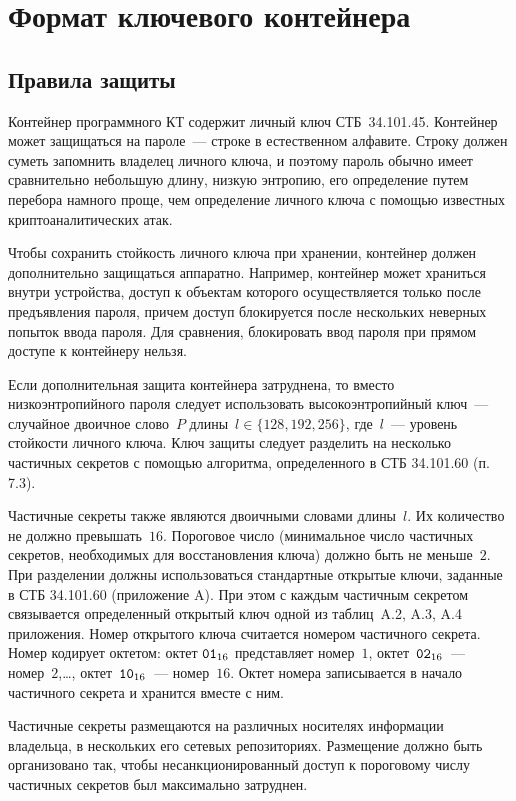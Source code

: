 \chapter{Формат ключевого контейнера}\label{CONT}

\section{Правила защиты}\label{CONT.Rules}

Контейнер программного КТ содержит личный ключ СТБ~34.101.45.
Контейнер может защищаться на пароле~--- строке в естественном алфавите. 
Строку должен суметь запомнить владелец личного ключа, и поэтому пароль 
обычно имеет сравнительно небольшую длину, низкую энтропию, его 
определение путем перебора намного проще, чем определение личного ключа с 
помощью известных криптоаналитических атак. 

Чтобы сохранить стойкость личного ключа при хранении, контейнер должен
дополнительно защищаться аппаратно. Например, контейнер может храниться
внутри устройства, доступ к объектам которого осуществляется только после 
предъявления пароля, причем доступ блокируется после нескольких неверных 
попыток ввода пароля. Для сравнения, блокировать ввод пароля при прямом 
доступе к контейнеру нельзя.  

Если дополнительная защита контейнера затруднена, то вместо 
низкоэнтропийного пароля следует использовать высокоэнтропийный ключ~--- 
случайное двоичное слово~$P$ длины~$l\in\{128,192,256\}$, где~$l$~--- 
уровень стойкости личного ключа.  
%
Ключ защиты следует разделить на несколько частичных секретов с помощью 
алгоритма, определенного в СТБ 34.101.60 (п. 7.3). 

Частичные секреты также являются двоичными словами длины~$l$. Их количество не 
должно превышать~$16$. Пороговое число (минимальное число частичных секретов,
необходимых для восстановления ключа) должно быть не меньше~$2$.
%
При разделении должны использоваться стандартные открытые 
ключи, заданные в СТБ 34.101.60 (приложение A). При этом с каждым 
частичным секретом связывается определенный открытый ключ одной из 
таблиц~A.2, A.3, A.4 приложения.  
%
Номер открытого ключа считается номером частичного секрета.
Номер кодирует октетом: октет $\texttt{01}_{16}$ представляет номер~$1$, 
октет~$\texttt{02}_{16}$~--- номер~$2$,\ldots, октет~$\texttt{10}_{16}$~--- номер~$16$.
Октет номера записывается в начало частичного секрета и хранится вместе с 
ним.

Частичные секреты размещаются на различных носителях информации 
владельца, в нескольких его сетевых репозиториях. 
%
Размещение должно быть организовано так, чтобы несанкционированный 
доступ к пороговому числу частичных секретов был максимально затруднен.

